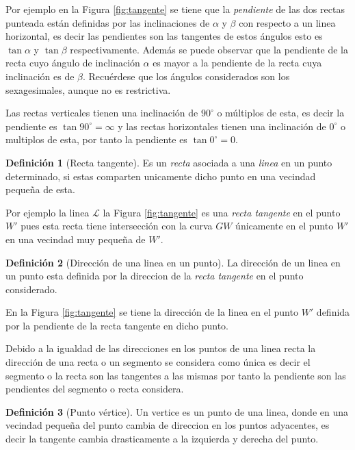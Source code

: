 \documentclass[16pt,]{krantz}
\theoremstyle{definition}
\newtheorem{definition}{Definición}[chapter]
\theoremstyle{definition}
\theoremstyle{definition}
\theoremstyle{definition}
\theoremstyle{remark}
\begin{document}
Por ejemplo en la Figura \ref{fig:tangente} se tiene que la \emph{pendiente} de las dos rectas punteada están definidas por las inclinaciones de \(\alpha\) y \(\beta\) con respecto a un linea horizontal, es decir las pendientes son las tangentes de estos ángulos esto es \(\tan \alpha\) y \(\tan \beta\) respectivamente. Además se puede observar que la pendiente de la recta cuyo ángulo de inclinación \(\alpha\) es mayor a la pendiente de la recta cuya inclinación es de \(\beta\). Recuérdese que los ángulos considerados son los sexagesimales, aunque no es restrictiva.

Las rectas verticales tienen una inclinación de \(90^\circ\) o múltiplos de esta, es decir la pendiente es \(\tan 90^\circ=\infty\) y las rectas horizontales tienen una inclinación de \(0^\circ\) o multiplos de esta, por tanto la pendiente es \(\tan 0^\circ=0\).

\begin{definition}[Recta tangente]
\protect\hypertarget{def:tangentew}{}{\label{def:tangentew} {} }Es un \emph{recta} asociada a una \emph{linea} en un punto determinado, si estas comparten unicamente dicho punto en una vecindad pequeña de esta.
\end{definition}

Por ejemplo la linea \(\mathcal{L}\) la Figura \ref{fig:tangente} es una \emph{recta tangente} en el punto \(W'\) pues esta recta tiene intersección con la curva \(GW\) únicamente en el punto \(W'\) en una vecindad muy pequeña de \(W'\).

\begin{definition}[Dirección de una linea en un punto]
\protect\hypertarget{def:direccion}{}{\label{def:direccion} {} }La dirección de un linea en un punto esta definida por la direccion de la \emph{recta tangente} en el punto considerado.
\end{definition}

En la Figura \ref{fig:tangente} se tiene la dirección de la linea en el punto \(W'\) definida por la pendiente de la recta tangente en dicho punto.

Debido a la igualdad de las direcciones en los puntos de una linea recta la dirección de una recta o un segmento se considera como única es decir el segmento o la recta son las tangentes a las mismas por tanto la pendiente son las pendientes del segmento o recta considera.

\begin{definition}[Punto vértice]
\protect\hypertarget{def:puntovertice}{}{\label{def:puntovertice} {} }Un vertice es un punto de una linea, donde en una vecindad pequeña del punto cambia de direccion en los puntos adyacentes, es decir la tangente cambia drasticamente a la izquierda y derecha del punto.
\end{definition}
\end{document}
